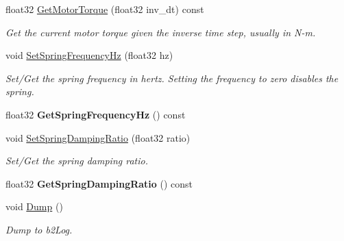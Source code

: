 \begin{DoxyCompactItemize}
\mbox{\label{classb2WheelJoint_a635497eba904925e06fd5316ddec4539}} 
float32 \hyperlink{classb2WheelJoint_a635497eba904925e06fd5316ddec4539}{Get\+Motor\+Torque} (float32 inv\+\_\+dt) const
\begin{DoxyCompactList}\small\item\em Get the current motor torque given the inverse time step, usually in N-\/m. \end{DoxyCompactList}\item 
\mbox{\label{classb2WheelJoint_af9f8fada5cb30f83aa2fbf486e9d347b}} 
void \hyperlink{classb2WheelJoint_af9f8fada5cb30f83aa2fbf486e9d347b}{Set\+Spring\+Frequency\+Hz} (float32 hz)
\begin{DoxyCompactList}\small\item\em Set/\+Get the spring frequency in hertz. Setting the frequency to zero disables the spring. \end{DoxyCompactList}\item 
\mbox{\label{classb2WheelJoint_a3a22add79f238b4243407956b031c9f4}} 
float32 {\bfseries Get\+Spring\+Frequency\+Hz} () const
\item 
\mbox{\label{classb2WheelJoint_a39b123ac045c8ec93faa65746e6655dc}} 
void \hyperlink{classb2WheelJoint_a39b123ac045c8ec93faa65746e6655dc}{Set\+Spring\+Damping\+Ratio} (float32 ratio)
\begin{DoxyCompactList}\small\item\em Set/\+Get the spring damping ratio. \end{DoxyCompactList}\item 
\mbox{\label{classb2WheelJoint_a18726ad5af314531f518132d6623bc61}} 
float32 {\bfseries Get\+Spring\+Damping\+Ratio} () const
\item 
\mbox{\label{classb2WheelJoint_a09534b6f4c5d0254711e0bcc7cf3b0e4}} 
void \hyperlink{classb2WheelJoint_a09534b6f4c5d0254711e0bcc7cf3b0e4}{Dump} ()
\begin{DoxyCompactList}\small\item\em Dump to b2\+Log. \end{DoxyCompactList}\item 
\mbox{\label{classb2WheelJoint_a43a301e48ba486278932c82d3a98abd8}} 

\end{DoxyCompactItemize}
